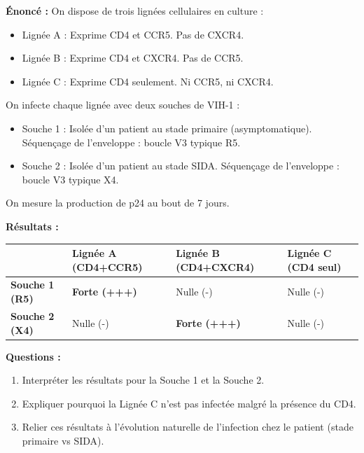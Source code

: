 \documentclass[11pt]{article}
\begin{document}
\begin{exoresolu}
\textbf{Énoncé :} On dispose de trois lignées cellulaires en culture :
\begin{itemize}
    \item Lignée A : Exprime CD4 et CCR5. Pas de CXCR4.
    \item Lignée B : Exprime CD4 et CXCR4. Pas de CCR5.
    \item Lignée C : Exprime CD4 seulement. Ni CCR5, ni CXCR4.
\end{itemize}
On infecte chaque lignée avec deux souches de VIH-1 :
\begin{itemize}
    \item Souche 1 : Isolée d'un patient au stade primaire (asymptomatique). Séquençage de l'enveloppe : boucle V3 typique R5.
    \item Souche 2 : Isolée d'un patient au stade SIDA. Séquençage de l'enveloppe : boucle V3 typique X4.
\end{itemize}
On mesure la production de p24 au bout de 7 jours.

\textbf{Résultats :}
\begin{center}
\begin{tabularx}{\linewidth}{|l|X|X|X|}\hline
 & \textbf{Lignée A (CD4+CCR5)} & \textbf{Lignée B (CD4+CXCR4)} & \textbf{Lignée C (CD4 seul)} \\ \hline
\textbf{Souche 1 (R5)} & \textbf{Forte (+++)} & Nulle (-) & Nulle (-) \\ \hline
\textbf{Souche 2 (X4)} & Nulle (-) & \textbf{Forte (+++)} & Nulle (-) \\ \hline
\end{tabularx}
\end{center}

\textbf{Questions :}
\begin{enumerate}
    \item Interpréter les résultats pour la Souche 1 et la Souche 2.
    \item Expliquer pourquoi la Lignée C n'est pas infectée malgré la présence du CD4.
    \item Relier ces résultats à l'évolution naturelle de l'infection chez le patient (stade primaire vs SIDA).
\end{enumerate}


\end{exoresolu}
\end{document}
